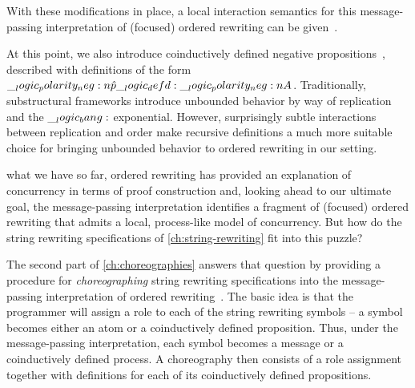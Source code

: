 
With these modifications in place, a local interaction semantics for this message-passing interpretation of (focused) ordered rewriting can be given~.

At this point, we also introduce coinductively defined negative propositions~, described with definitions of the form $\__logic_polarity_neg:n {\hat{p}} \__logic_defd: \__logic_polarity_neg:n {A}$.
Traditionally, sub\-struc\-tural frameworks introduce unbounded behavior by way of replication and the $\__logic_bang:$ exponential.\autocites{Polakow:CMU01}{Watkins+:CMU02}
However, surprisingly subtle interactions between replication and order make recursive definitions a much more suitable choice for bringing unbounded behavior to ordered rewriting in our setting.




 what we have so far, ordered rewriting has provided an explanation of concurrency in terms of proof construction and, looking ahead to our ultimate goal, the message-passing interpretation identifies a fragment of (focused) ordered rewriting that admits a local, process-like model of concurrency.
But how do the string rewriting specifications of \cref{ch:string-rewriting} fit into this puzzle?

The second part of \cref{ch:choreographies} answers that question by providing a procedure for \emph{choreographing} string rewriting specifications into the message-passing interpretation of ordered rewriting~.
The basic idea is that the programmer will assign a role to each of the string rewriting symbols -- a symbol becomes either an atom or a coinductively defined proposition.
Thus, under the message-passing interpretation, each symbol becomes a message or a coinductively defined process.
A choreography then consists of a role assignment together with definitions for each of its coinductively defined propositions.

